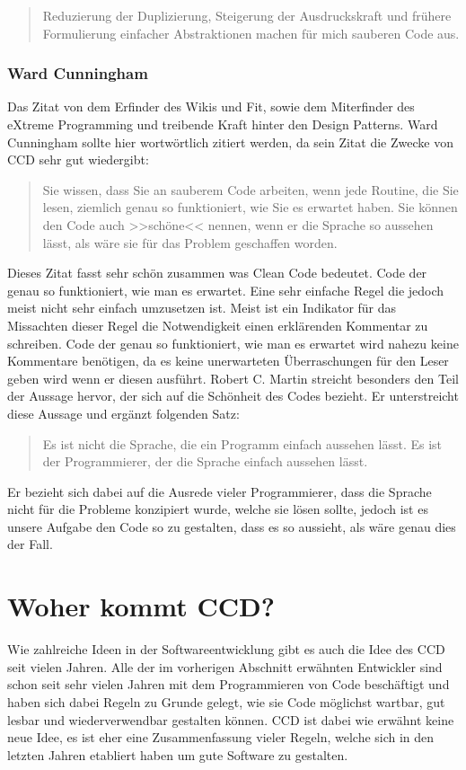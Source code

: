 \begin{quotation}
Reduzierung der Duplizierung, Steigerung der Ausdruckskraft und frühere Formulierung einfacher Abstraktionen machen für mich sauberen Code aus.
\end{quotation}

\subsubsection{Ward Cunningham}
Das Zitat von dem Erfinder des Wikis und Fit, sowie dem Miterfinder des eXtreme Programming und treibende Kraft hinter den Design Patterns. Ward Cunningham sollte hier wortwörtlich zitiert werden, da sein Zitat die Zwecke von CCD sehr gut wiedergibt:

\begin{quotation}
	Sie wissen, dass Sie an sauberem Code arbeiten, wenn jede Routine, die Sie lesen, ziemlich genau so funktioniert, wie Sie es erwartet haben. Sie können den Code auch >>schöne<< nennen, wenn er die Sprache so aussehen lässt, als wäre sie für das Problem geschaffen worden.
\end{quotation}

Dieses Zitat fasst sehr schön zusammen was Clean Code bedeutet. Code der genau so funktioniert, wie man es erwartet. Eine sehr einfache Regel die jedoch meist nicht sehr einfach umzusetzen ist. Meist ist ein Indikator für das Missachten dieser Regel die Notwendigkeit einen erklärenden Kommentar zu schreiben. Code der genau so funktioniert, wie man es erwartet wird nahezu keine Kommentare benötigen, da es keine unerwarteten Überraschungen für den Leser geben wird wenn er diesen ausführt. Robert C. Martin streicht besonders den Teil der Aussage hervor, der sich auf die Schönheit des Codes bezieht. Er unterstreicht diese Aussage und ergänzt folgenden Satz:

\begin{quotation}
Es ist nicht die Sprache, die ein Programm einfach aussehen lässt. Es ist der Programmierer, der die Sprache einfach aussehen lässt.
\end{quotation}

Er bezieht sich dabei auf die Ausrede vieler Programmierer, dass die Sprache nicht für die Probleme konzipiert wurde, welche sie lösen sollte, jedoch ist es unsere Aufgabe den Code so zu gestalten, dass es so aussieht, als wäre genau dies der Fall.

\section{Woher kommt CCD?}
Wie zahlreiche Ideen in der Softwareentwicklung gibt es auch die Idee des CCD seit vielen Jahren. Alle der im vorherigen Abschnitt erwähnten Entwickler sind schon seit sehr vielen Jahren mit dem Programmieren von Code beschäftigt und haben sich dabei Regeln zu Grunde gelegt, wie sie Code möglichst wartbar, gut lesbar und wiederverwendbar gestalten können. CCD ist dabei wie erwähnt keine neue Idee, es ist eher eine Zusammenfassung vieler Regeln, welche sich in den letzten Jahren etabliert haben um gute Software zu gestalten.

